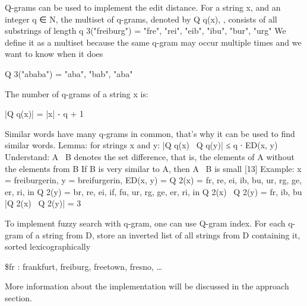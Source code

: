 Q-grams can be used to implement the edit distance. For a string x, and an integer q ∈ N, the multiset of q-grams, denoted by Q q(x), , consists of all substrings of length q 3("freiburg") = { "fre", "rei", "eib", "ibu", "bur", "urg" }
We define it as a multiset because the same q-gram may occur multiple times and we want to know when it does 

Q 3("ababa") = { "aba", "bab", "aba" }

The number of q-grams of a string x is:

|Q q(x)| = |x| - q + 1

Similar words have many q-grams in common, that's why it can be used to find similar words. 
Lemma: for strings x and y: |Q q(x) \ Q q(y)| ≤ q ∙ ED(x, y)
Understand: A \ B denotes the set difference, that is, the elements of A without the elements from B If B is very similar to A, then A \ B is small [13]
Example:
x = freiburgerin, y = breifurgerin, ED(x, y) = Q 2(x) = { fr, re, ei, ib, bu, ur, rg, ge, er, ri, in } Q 2(y) = { br, re, ei, if, fu, ur, rg, ge, er, ri, in } 
Q 2(x) \ Q 2(y) = {fr, ib, bu}
|Q 2(x) \ Q 2(y)| = 3

To implement fuzzy search with q-gram, one can use Q-gram index. For each q-gram of a string from D, store an inverted list of all strings from D containing it, sorted lexicographically

\$fr : frankfurt, freiburg, freetown, fresno, …

More information about the implementation will be discussed in the approach section.
